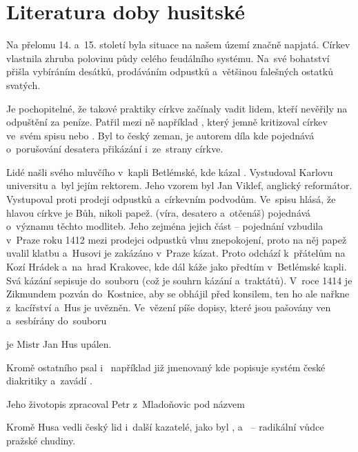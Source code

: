 \chapter{Literatura doby husitské}
Na přelomu 14. a~15. století byla situace na našem území značně napjatá. Církev vlastnila
zhruba polovinu půdy celého feudálního systému. Na~své bohatství přišla vybíráním desátků, 
prodáváním odpustků a~většinou falešných ostatků svatých.

Je pochopitelné, že takové praktiky církve začínaly vadit lidem, kteří nevěřily na odpuštění 
za peníze. Patřil mezi ně například , který jemně kritizoval církev ve~svém
spisu  nebo . Byl to
český zeman, je autorem díla  kde pojednává
o~porušování desatera přikázání i~ze~strany církve.

Lidé našli svého mluvčího v~kapli Betlémské, kde kázal . Vystudoval Karlovu
universitu a~byl jejím rektorem. Jeho vzorem byl Jan Viklef, anglický reformátor. Vystupoval proti
prodeji odpustků a~církevním podvodům. Ve~spisu  hlásá, že hlavou církve je Bůh, nikoli papež.
 (víra, desatero a~otčenáš) pojednává o~významu těchto modliteb.
Jeho  zejména jejich část -- pojednání  vzbudila 
v~Praze roku 1412 mezi prodejci odpustků vlnu znepokojení, proto na něj papež uvalil klatbu a~Husovi je zakázáno 
v~Praze kázat. Proto odchází k~přátelům na Kozí Hrádek a~na~hrad Krakovec, kde dál káže jako předtím v~Betlémské kapli.
Svá kázání sepisuje do~souboru  (což je souhrn kázání a~traktátů). V~roce 1414 je Zikmundem 
pozván do~Kostnice, aby se obhájil před konsilem, ten ho ale nařkne z~kacířství a~Hus je uvězněn. 
Ve~vězení píše dopisy, které jsou pašovány ven a~sesbírány do~souboru  

 je Mistr Jan Hus upálen.

Kromě ostatního psal i~ například již jmenovaný 
 kde popisuje systém české diakritiky a~zavádí .

Jeho životopis zpracoval Petr z~Mladoňovic pod názvem 

Kromě Husa vedli český lid i~další kazatelé, jako byl , 
a~ -- radikální vůdce pražské chudiny.

